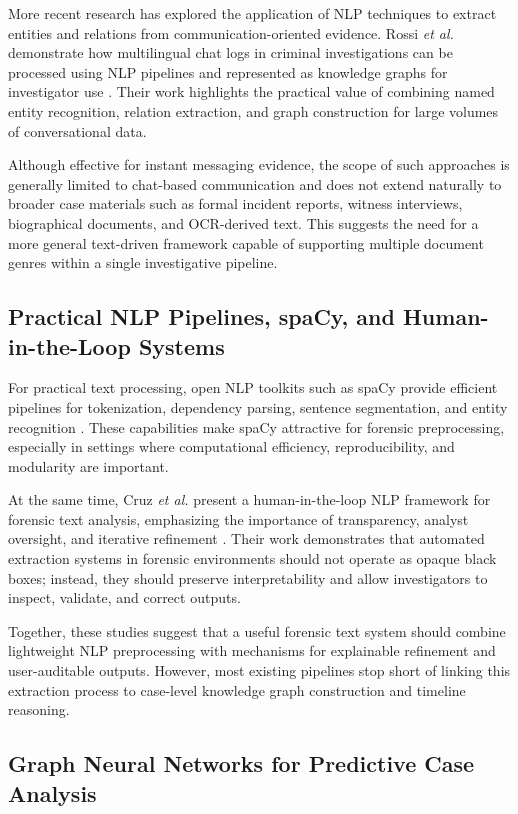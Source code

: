 \documentclass{ieeeaccess}
\begin{document}
More recent research has explored the application of NLP techniques to extract entities and relations from communication-oriented evidence. Rossi \emph{et al.} demonstrate how multilingual chat logs in criminal investigations can be processed using NLP pipelines and represented as knowledge graphs for investigator use \cite{imchat2021}. Their work highlights the practical value of combining named entity recognition, relation extraction, and graph construction for large volumes of conversational data.

Although effective for instant messaging evidence, the scope of such approaches is generally limited to chat-based communication and does not extend naturally to broader case materials such as formal incident reports, witness interviews, biographical documents, and OCR-derived text. This suggests the need for a more general text-driven framework capable of supporting multiple document genres within a single investigative pipeline.

\subsection{Practical NLP Pipelines, spaCy, and Human-in-the-Loop Systems}

For practical text processing, open NLP toolkits such as spaCy provide efficient pipelines for tokenization, dependency parsing, sentence segmentation, and entity recognition \cite{spacy2020,spacydocs}. These capabilities make spaCy attractive for forensic preprocessing, especially in settings where computational efficiency, reproducibility, and modularity are important.

At the same time, Cruz \emph{et al.} present a human-in-the-loop NLP framework for forensic text analysis, emphasizing the importance of transparency, analyst oversight, and iterative refinement \cite{forensicpipeline2022}. Their work demonstrates that automated extraction systems in forensic environments should not operate as opaque black boxes; instead, they should preserve interpretability and allow investigators to inspect, validate, and correct outputs.

Together, these studies suggest that a useful forensic text system should combine lightweight NLP preprocessing with mechanisms for explainable refinement and user-auditable outputs. However, most existing pipelines stop short of linking this extraction process to case-level knowledge graph construction and timeline reasoning.

\subsection{Graph Neural Networks for Predictive Case Analysis}
\end{document}
